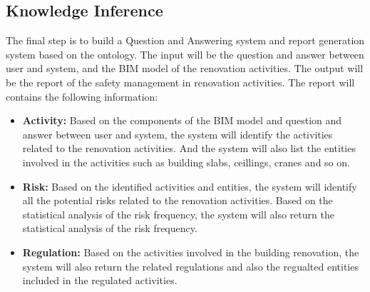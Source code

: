 \subsection*{Knowledge Inference}
\label{sec:knowledge_inference}
The final step is to build a Question and Answering system and report generation system based on the ontology.
The input will be the question and answer between user and system, and the BIM model of the renovation activities.
The output will be the report of the safety management in renovation activities. 
The report will contains the following information:
\begin{itemize}
   \item \textbf{Activity: } 
   Based on the components of the BIM model and question and answer between user and system,
    the system will identify the activities related to the renovation activities.
    And the system will also list the entities involved in the activities such as building slabs, ceillings, cranes and so on.
    \item \textbf{Risk: }
    Based on the identified activities and entities, the system will identify all the potential risks related to the renovation activities.
    Based on the statistical analysis of the risk frequency, the system will also return the statistical analysis of the risk frequency.
    \item \textbf{Regulation: }
    Based on the activities involved in the building renovation, the system will also return the related regulations
    and also the regualted entities included in the regulated activities. 
\end{itemize}

